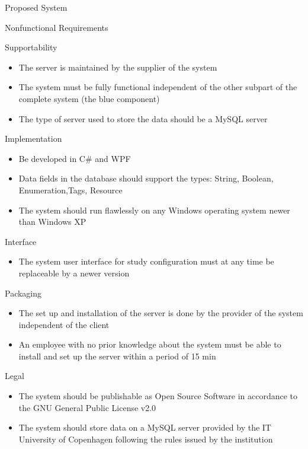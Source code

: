 \documentclass{article}
\begin{document}
\begin{section}{Proposed System}
\begin{subsection}{Nonfunctional Requirements}
\begin{subsubsection}{Supportability}
\begin{itemize}
\item The server is maintained by the supplier of the system
\item The system must be fully functional independent of the other subpart of the complete system (the blue component)
\item The type of server used to store the data should be a MySQL server
\end{itemize}
\end{subsubsection}

\begin{subsubsection}{Implementation}
\begin{itemize}
\item Be developed in C\# and WPF
\item Data fields in the database should support the types: String, Boolean, Enumeration,Tags, Resource
\item The system should run flawlessly on any Windows operating system newer than Windows XP
\end{itemize}
\end{subsubsection}

\begin{subsubsection}{Interface}
\begin{itemize}
\item The system user interface for study configuration must at any time be replaceable by a newer version
\end{itemize}
\end{subsubsection}

\begin{subsubsection}{Packaging}
\begin{itemize}
\item The set up and installation of the server is done by the provider of the system independent of the client
\item An employee with no prior knowledge about the system must be able to install and set up the server within a period of 15 min
\end{itemize}
\end{subsubsection}

\begin{subsubsection}{Legal}
\begin{itemize}
\item The system should be publishable as Open Source Software in accordance to the GNU General Public License v2.0
\item The system should store data on a MySQL server provided by the IT University of Copenhagen following the rules issued by the institution
\end{itemize}
\end{subsubsection}

\end{subsection}

\end{section}
\end{document}
